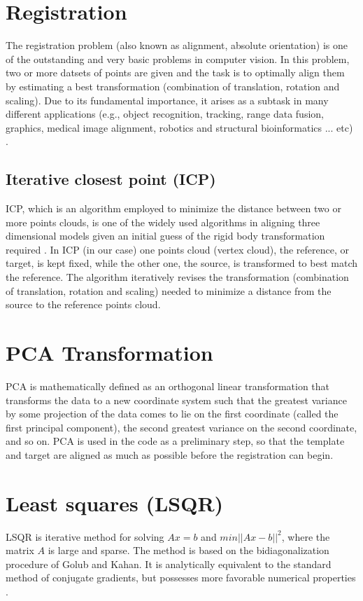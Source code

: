 \documentclass[../structure.tex]{subfiles}
\begin{document}
\section{Registration}
	The registration problem (also known as alignment, absolute orientation) is one of the outstanding and very basic problems in computer vision. In this problem, two or more datsets of points are given and the task is to optimally align them by estimating a best transformation (combination of translation, rotation and scaling). Due to its fundamental importance, it arises as a subtask in many different applications (e.g., object recognition, tracking, range data fusion, graphics, medical image alignment, robotics and structural bioinformatics ... etc) \cite{Li2007}.
		\subsection{Iterative closest point (ICP)}
		 ICP, which is an algorithm employed to minimize the distance between two or more points clouds, is one of the widely used algorithms in aligning three dimensional models given an initial guess of the rigid body transformation required \cite{Zhang1994}.
		 In ICP (in our case) one points cloud (vertex cloud), the reference, or target, is kept fixed, while the other one, the source, is transformed to best match the reference. The algorithm iteratively revises the transformation (combination of translation, rotation and scaling) needed to minimize a distance from the source to the reference points cloud.
\section{PCA Transformation}
PCA is mathematically defined as an orthogonal linear transformation that transforms the data to a new coordinate system such that the greatest variance by some projection of the data comes to lie on the first coordinate (called the first principal component), the second greatest variance on the second coordinate, and so on\cite{Jolliffe2002}.
PCA is used in the code as a preliminary step, so that the template and target are aligned as much as possible before the registration can begin.
\section{Least squares (LSQR)}
LSQR is iterative method for solving $Ax=b$ and $min||Ax-b||^2$, where the matrix $A$ is large and sparse. The method is based on the bidiagonalization procedure of Golub and Kahan. It is analytically equivalent to the standard method of conjugate gradients, but possesses more favorable numerical properties \cite{Paige1982a}.
\end{document}
